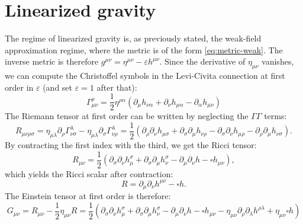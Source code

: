 \documentclass[a4paper]{article}
\begin{document}
\section{Linearized gravity}
The regime of linearized gravity is, as previously stated, the weak-field approximation regime, where the metric is of the form \eqref{eq:metric-weak}. The inverse metric is therefore $g^{\mu\nu} = \eta^{\mu\nu}-\varepsilon h^{\mu\nu}$.
Since the derivative of $\eta_{\mu\nu}$ vanishes, we can compute the Christoffel symbols in the Levi-Civita connection at first order in $\varepsilon$ (and set $\varepsilon=1$ after that):
\begin{equation}
  \Gamma_{\mu\nu}^{\rho} = \frac{1}{2}\eta^{\rho\alpha}(\partial_{\mu}h_{\nu\alpha} + \partial_{\nu}h_{\mu\alpha} - \partial_{\alpha}h_{\mu\nu})
  \label{eq:christoffel-symbols}
\end{equation}
The Riemann tensor at first order can be written by neglecting the $\Gamma\Gamma$ terms:
\begin{equation}
  R_{\mu\nu\rho\sigma} = \eta_{\mu\lambda}\partial_{\rho}\Gamma_{\nu\sigma}^{\lambda} - \eta_{\mu\lambda}\partial_{\sigma}\Gamma^{\lambda}_{\nu\rho} = \frac{1}{2}(\partial_{\rho}\partial_{\nu}h_{\mu\sigma} + \partial_{\sigma}\partial_{\mu}h_{\nu\rho} - \partial_{\sigma}\partial_{\nu}h_{\mu\rho} - \partial_{\rho}\partial_{\mu}h_{\nu\sigma}).
  \label{eq:riemann-tensor}
\end{equation}
By contracting the first index with the third, we get the Ricci tensor:
\begin{equation}
  R_{\mu\nu} = \frac{1}{2}(\partial_{\sigma}\partial_{\nu}h^{\sigma}_{\mu} + \partial_{\sigma}\partial_{\mu}h^{\sigma}_{\nu}-\partial_{\mu}\partial_{\nu}h-\square h_{\mu\nu}),
  \label{eq:ricci-tensor}
\end{equation}
which yields the Ricci scalar after contraction:
\begin{equation}
  R = \partial_{\mu}\partial_{\nu}h^{\mu\nu} - \square h.
  \label{eq:ricci-scalar}
\end{equation}
The Einstein tensor at first order is therefore:
\begin{equation}
  G_{\mu\nu} = R_{\mu\nu} - \frac{1}{2}\eta_{\mu\nu}R
  = \frac{1}{2}(\partial_{\sigma}\partial_{\nu}h^{\sigma}_{\mu} + \partial_{\sigma}\partial_{\mu}h^{\sigma}_{\nu} - \partial_{\mu}\partial_{\nu}h - \square h_{\mu\nu} - \eta_{\mu\nu} \partial_{\rho}\partial_{\lambda}h^{\rho\lambda} + \eta_{\mu\nu}\square h)
  \label{eq:einstein-tensor}
\end{equation}
\end{document}
